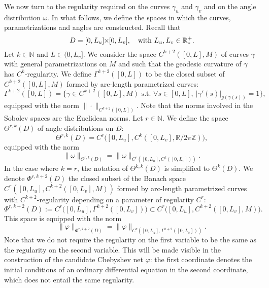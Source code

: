 \documentclass{article}
\newcommand{\PLH}{{\mkern-1mu\times\mkern-1mu}}
\newcommand{\Times}{\PLH}
\newcommand{\R}{\mathbb{R}}
\newcommand{\Z}{\mathbb{Z}}
\newcommand{\surf}{M}
\newcommand{\EN}{\mathbb{N}}
\theoremstyle{remark}
\theoremstyle{prpart}
\begin{document}
We now turn to the regularity required on the curves $\gamma_u$ and $\gamma_v$ and on the angle distribution $\omega$. In what follows, we define the spaces in which the curves, parametrizations and angles are constructed.  %
Recall that
\begin{equation*}
  D=[0,L_u]\Times[0,L_v],\quad\text{with } L_u,L_v\in\R_\ast^+.
\end{equation*}
Let $k\in\EN$ and $L\in(0,L_v]$. We consider the space $C^{k+2}([0,L],\surf)$ of curves $\gamma$ with general parametrizations on $\surf$ and such that the geodesic curvature of $\gamma$ has $C^{k}$-regularity. %
We define $\Gamma^{k+2}([0,L])$ to be the closed subset of $C^{k+2}([0,L],\surf)$ formed by arc-length parametrized curves:
\begin{equation*}  
  \Gamma^{k+2}([0,L]) = \Big\{\gamma \in C^{k+2}([0,L], \surf) \text{ s.t. } \forall s\in[0,L],~ |\gamma'(s)|_{g(\gamma(s))} = 1\Big\},
\end{equation*}
equipped with the norm $\|\cdot\|_{C^{k+2}([0,L])}$. Note that the norms involved in the Sobolev spaces are the Euclidean norms. Let $r\in\EN$. We define the space $\Theta^{r,k}(D)$ of angle distributions on $D$:
\begin{equation*}
  \Theta^{r,k}(D) = C^r\big([0,L_u],C^k([0,L_v], \R/2\pi\Z)\big),
\end{equation*}
equipped with the norm 
\begin{equation*}
  \|\omega\|_{\Theta^{r,k}(D)} = \|\omega\|_{C^r([0,L_u],C^k([0,L_v]))}.
\end{equation*}
 In the case where $k=r$, the notation of $\Theta^{k,k}(D)$ is simplified to $\Theta^k(D)$. We denote $\Phi^{r,k+2}(D)$ the closed subset of the Banach space $C^r([0,L_u],C^{k+2}([0,L_v],\surf))$ formed by arc-length parametrized curves with $C^{k+2}$-regularity depending on a parameter of regularity $C^r$:
\begin{equation*}  
  \Phi^{r,k+2}(D) := C^r\big([0,L_u], \Gamma^{k+2}([0,L_v])\big)\subset C^r\big([0,L_u],C^{k+2}([0,L_v],\surf)\big).
\end{equation*}
This space is equipped with the norm 
\begin{equation*}
  \|\varphi\|_{\Phi^{r,k+2}(D)} = \|\varphi\|_{C^r([0,L_u],\Gamma^{k+2}([0,L_v]))}.
\end{equation*}
 Note that we do not require the regularity on the first variable to be the same as the regularity on the second variable. This will be made visible in the construction of the candidate Chebyshev net $\varphi$: the first coordinate denotes the initial conditions of an ordinary differential equation in the second coordinate, which does not entail the same regularity.
\end{document}
